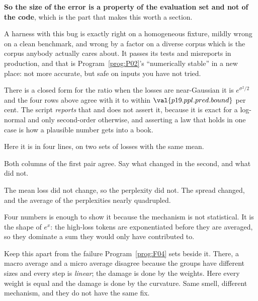 \begin{fr}
\textbf{So the size of the error is a property of the evaluation set and not
of the code}, which is the part that makes this worth a section.

A harness with this bug is exactly right on a homogeneous fixture, mildly
wrong on a clean benchmark, and wrong by a factor on a diverse corpus \dash{}
which is the corpus anybody actually cares about. It passes its tests and
misreports in production, and that is Program~\ref{prog:P02}'s
\enquote{numerically stable} in a new place: not more accurate, but safe on
inputs you have not tried.

\begin{note}
There is a closed form for the ratio when the losses are near-Gaussian
\dash{} it is $e^{\sigma^{2}/2}$ \dash{} and the four rows above agree with
it to within $\val{p19.ppl.pred.bound}$ per cent. The script \emph{reports}
that and does not assert it, because it is exact for a log-normal and only
second-order otherwise, and asserting a law that holds in one case is how a
plausible number gets into a book.
\end{note}
\end{fr}

\begin{fr}
Here it is in four lines, on two sets of losses with the same mean.


Both columns of the first pair agree. Say what changed in the second, and what
did not.
\dotline
\nextframe
\end{fr}

\begin{fr}
\begin{ansblock}
The mean loss did not change, so the perplexity did not. The spread changed,
and the average of the perplexities nearly quadrupled.
\end{ansblock}

Four numbers is enough to show it because the mechanism is not statistical.
It is the shape of $e^{x}$: the high-loss tokens are exponentiated before they
are averaged, so they dominate a sum they would only have contributed to.

\begin{note}
Keep this apart from the failure Program~\ref{prog:F04} sets beside it. There,
a macro average and a micro average disagree because the groups have different
sizes and every step is \emph{linear}; the damage is done by the weights.
Here every weight is equal and the damage is done by the curvature. Same
smell, different mechanism, and they do not have the same fix.
\end{note}
\end{fr}

